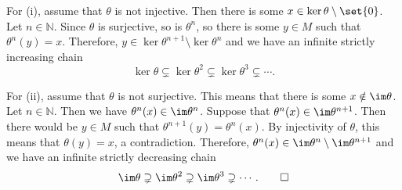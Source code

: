For (i), assume that $\theta$ is not injective. Then there is some $x \in \ker\theta\setminus\set{0}$.
Let $n \in \mathbb{N}$. Since $\theta$ is surjective, so is $\theta^n$, so there
is some $y \in M$ such that $\theta^n(y) = x$. Therefore, $y \in \ker\theta^{n+1}\setminus\ker\theta^n$
and we have an infinite strictly increasing chain
\[ \ker\theta \subsetneq \ker\theta^2 \subsetneq \ker\theta^3\subsetneq \cdots. \]

For (ii), assume that $\theta$ is not surjective. This means that there is some
$x \notin \im\theta$. Let $n \in \mathbb{N}$. Then we have $\theta^n(x) \in \im\theta^n$.
Suppose that $\theta^n(x)  \in \im\theta^{n+1}$. Then there would be $y \in M$
such that $\theta^{n+1}(y) = \theta^n(x)$. By injectivity of $\theta$, this means
that $\theta(y) = x$, a contradiction. Therefore, $\theta^n(x) \in \im\theta^n\setminus \im\theta^{n+1}$
and we have an infinite strictly decreasing chain
\[ \im\theta \supsetneq \im\theta^2 \supsetneq\im\theta^3\supsetneq\cdots.\qedhere \]
